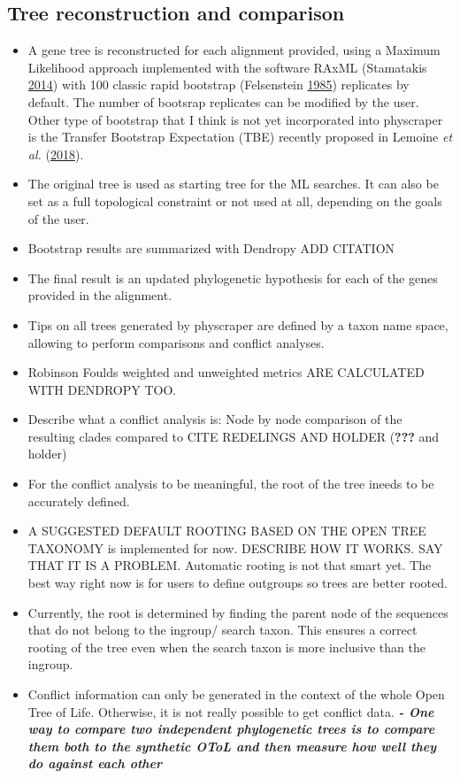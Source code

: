 \documentclass[]{article}
\providecommand{\tightlist}{%
  \setlength{\itemsep}{0pt}\setlength{\parskip}{0pt}}
\begin{document}
\hypertarget{tree-reconstruction-and-comparison}{%
\subsection{Tree reconstruction and comparison}\label{tree-reconstruction-and-comparison}}

\begin{itemize}
\tightlist
\item
  A gene tree is reconstructed for each alignment provided, using a Maximum Likelihood approach implemented with the software RAxML (Stamatakis \protect\hyperlink{ref-stamatakis2014raxml}{2014})
  with 100 classic rapid bootstrap (Felsenstein \protect\hyperlink{ref-felsenstein1985confidence}{1985}) replicates by default. The number of bootsrap replicates can be modified by the user.
  Other type of bootstrap that I think is not yet incorporated into physcraper is the Transfer Bootstrap Expectation (TBE) recently proposed in Lemoine \emph{et al.} (\protect\hyperlink{ref-lemoine2018renewing}{2018}).
\item
  The original tree is used as starting tree for the ML searches. It can also be set as a full topological constraint or not used at all, depending on the goals of the user.
\item
  Bootstrap results are summarized with Dendropy ADD CITATION
\item
  The final result is an updated phylogenetic hypothesis for each of the genes provided in the alignment.
\item
  Tips on all trees generated by physcraper are defined by a taxon name space, allowing to perform comparisons and conflict analyses.
\item
  Robinson Foulds weighted and unweighted metrics ARE CALCULATED WITH DENDROPY TOO.
\item
  Describe what a conflict analysis is: Node by node comparison of the resulting clades compared to CITE REDELINGS AND HOLDER ({\textbf{???}} and holder)
\item
  For the conflict analysis to be meaningful, the root of the tree ineeds to be accurately defined.
\item
  A SUGGESTED DEFAULT ROOTING BASED ON THE OPEN TREE TAXONOMY is implemented for now. DESCRIBE HOW IT WORKS. SAY THAT IT IS A PROBLEM. Automatic rooting is not that smart yet. The best way right now is for users to define outgroups so trees are better rooted.
\item
  Currently, the root is determined by finding the parent node of the sequences that do not belong to the ingroup/ search taxon. This ensures a correct rooting of the tree even when the search taxon is more inclusive than the ingroup.
\item
  Conflict information can only be generated in the context of the whole Open Tree of
  Life. Otherwise, it is not really possible to get conflict data.
  \textbf{\emph{- One way to compare two independent phylogenetic trees is to compare them both to
  the synthetic OToL and then measure how well they do against each other}}
\end{itemize}
\end{document}
